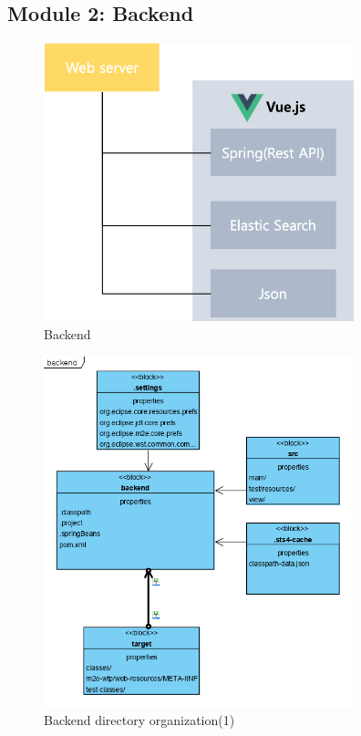 \documentclass[conference]{IEEEtran}
\begin{document}
  \subsection{Module 2: Backend}
\begin{figure}[htbp]
\centerline{\includegraphics[width=90mm,scale=0.5]{fig/6_6.png}}
\caption{Backend}
\label{fig}
\end{figure}


\begin{figure}[htbp]
\centerline{\includegraphics[width=90mm,scale=0.5]{fig/backend1.png}}
\caption{Backend directory organization(1)}
\label{fig}
\end{figure}
\end{document}
